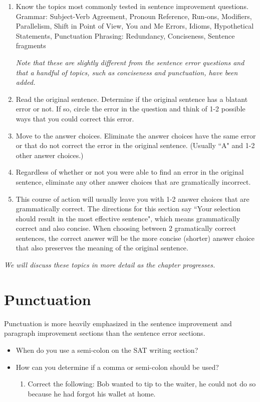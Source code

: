 \documentclass[12pt]{book}
\begin{document}
\begin{enumerate}
\begin{enumerate}
\item Know the topics most commonly tested in sentence improvement questions.\\
Grammar: Subject-Verb Agreement, Pronoun Reference, Run-ons, Modifiers, Parallelism, Shift in Point of View, You and Me Errors,
Idioms, Hypothetical Statements, Punctuation
Phrasing: Redundancy, Conciseness, Sentence fragments

\textit{Note that these are slightly different from the sentence error questions and that a handful of topics, such as conciseness and punctuation, have been added.}

\item Read the original sentence. Determine if the original sentence has a blatant error or not. If so, circle the error in the question and think of 1-2 possible ways that you could correct this error.  

\item Move to the answer choices.  Eliminate the answer choices have the same error or that do not correct the error in the original sentence. (Usually ``A" and 1-2 other answer choices.)

\item Regardless of whether or not you were able to find an error in the original sentence, eliminate any other answer choices that are gramatically incorrect. 

\item This course of action will usually leave you with 1-2 answer choices that are grammatically correct. The directions for this section say ``Your selection should result in the most effective sentence", which means grammatically correct and also concise. When choosing between 2 gramatically correct sentences, the correct answer will be the more concise (shorter) answer choice that also  preserves the meaning of the original sentence. 

\end{enumerate} 

\textit{We will discuss these topics in more detail as the chapter progresses. }

\section{Punctuation}
Punctuation is more heavily emphasized in the sentence improvement and paragraph improvement sections than the sentence error sections. 
\begin{itemize}
\item When do you use a semi-colon on the SAT writing section? \hrulefill
\item How can you determine if a comma or semi-colon should be used? \hrulefill
\begin{enumerate}
\item Correct the following: Bob wanted to tip to the waiter, he could not do so because he had forgot his wallet at home.  
\end{enumerate}


\end{itemize}
\end{enumerate}
\end{document}
